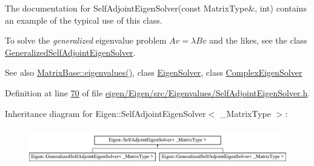The documentation for Self\+Adjoint\+Eigen\+Solver(const Matrix\+Type\&, int) contains an example of the typical use of this class.

To solve the {\itshape generalized} eigenvalue problem $ Av = \lambda Bv $ and the likes, see the class \hyperlink{group___eigenvalues___module_class_eigen_1_1_generalized_self_adjoint_eigen_solver}{Generalized\+Self\+Adjoint\+Eigen\+Solver}.

\begin{DoxySeeAlso}{See also}
\hyperlink{group___core___module_a30430fa3d5b4e74d312fd4f502ac984d}{Matrix\+Base\+::eigenvalues()}, class \hyperlink{group___eigenvalues___module_class_eigen_1_1_eigen_solver}{Eigen\+Solver}, class \hyperlink{group___eigenvalues___module_class_eigen_1_1_complex_eigen_solver}{Complex\+Eigen\+Solver} 
\end{DoxySeeAlso}


Definition at line \hyperlink{eigen_2_eigen_2src_2_eigenvalues_2_self_adjoint_eigen_solver_8h_source_l00070}{70} of file \hyperlink{eigen_2_eigen_2src_2_eigenvalues_2_self_adjoint_eigen_solver_8h_source}{eigen/\+Eigen/src/\+Eigenvalues/\+Self\+Adjoint\+Eigen\+Solver.\+h}.

Inheritance diagram for Eigen\+:\+:Self\+Adjoint\+Eigen\+Solver$<$ \+\_\+\+Matrix\+Type $>$\+:\begin{figure}[H]
\begin{center}
\leavevmode
\includegraphics[height=1.600000cm]{group___eigenvalues___module}
\end{center}
\end{figure}
